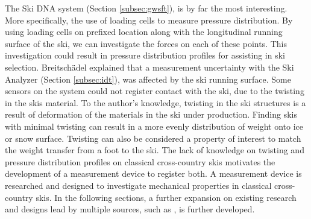 The Ski DNA system (Section \ref{subsec:gwsft}), is by far the most interesting. More specifically, the use of loading cells to measure pressure distribution. By using loading cells on prefixed location along with the longitudinal running surface of the ski, we can investigate the forces on each of these points. This investigation could result in pressure distribution profiles for assisting in ski selection. Breitschädel explained that a measurement uncertainty with the Ski Analyzer (Section \ref{subsec:idt}), was affected by the ski running surface. Some sensors on the system could not register contact with the ski, due to the twisting in the skis material.
To the author's knowledge, twisting in the ski structures is a result of deformation of the materials in the ski under production. Finding skis with minimal twisting can result in a more evenly distribution of weight onto ice or snow surface. Twisting can also be considered a property of interest to match the weight transfer from a foot to the ski.
The lack of knowledge on twisting and pressure distribution profiles on classical cross-country skis motivates the development of a measurement device to register both. A measurement device is researched and designed to investigate mechanical properties in classical cross-country skis. In the following sections, a further expansion on existing research and designs lead by multiple sources, such as \cite{ronbeck_2001}, \cite{breitschadel_variation_2012,breitschadel_technical_2014} is further developed.

